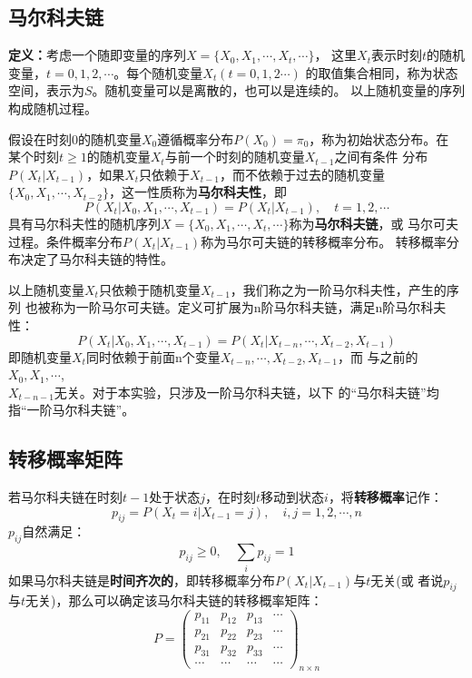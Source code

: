 \documentclass[12pt, a4paper, oneside]{ctexart}
\begin{document}
	\subsection{马尔科夫链}
	\textbf{定义：}\quad 考虑一个随即变量的序列$X=\{X_0,X_1,\cdots,X_t,\cdots \}$，
	这里$X_t$表示时刻$t$的随机变量，$t=0,1,2,\cdots$。每个随机变量$X_t(t=0,1,2\cdots)$
	的取值集合相同，称为状态空间，表示为$S$。随机变量可以是离散的，也可以是连续的。
	以上随机变量的序列构成随机过程。\par 
	假设在时刻0的随机变量$X_0$遵循概率分布$P(X_0)=\pi_0$，称为初始状态分布。在
	某个时刻$t\geq 1$的随机变量$X_t$与前一个时刻的随机变量$X_{t-1}$之间有条件
	分布$P(X_t|X_{t-1})$，如果$X_t$只依赖于$X_{t-1}$，而不依赖于过去的随机变量
	$\{X_0,X_1,\cdots,X_{t-2}\}$，这一性质称为\textbf{马尔科夫性}，即
	$$P(X_t|X_0,X_1,\cdots,X_{t-1})=P(X_t|X_{t-1}),\quad t=1,2,\cdots $$
	具有马尔科夫性的随机序列$X=\{X_0,X_1,\cdots,X_t,\cdots \}$称为\textbf{马尔科夫链}，或
	马尔可夫过程。条件概率分布$P(X_t|X_{t-1})$称为马尔可夫链的转移概率分布。
	转移概率分布决定了马尔科夫链的特性。\par 
	\vspace*{1em}
	以上随机变量$X_t$只依赖于随机变量$X_{t-1}$，我们称之为一阶马尔科夫性，产生的序列
	也被称为一阶马尔可夫链。定义可扩展为n阶马尔科夫链，满足n阶马尔科夫性：
	$$P(X_t|X_0,X_1,\cdots ,X_{t-1})=P(X_t|X_{t-n},\cdots ,X_{t-2},X_{t-1})$$
	即随机变量$X_t$同时依赖于前面n个变量$X_{t-n},\cdots,X_{t-2},X_{t-1}$，而
	与之前的$X_0,X_1,\cdots$,\\$X_{t-n-1}$无关。对于本实验，只涉及一阶马尔科夫链，以下
	的“马尔科夫链”均指“一阶马尔科夫链”。
	
	\subsection{转移概率矩阵}
	若马尔科夫链在时刻$t-1$处于状态$j$，在时刻$t$移动到状态$i$，将\textbf{转移概率}记作：
	$$p_{ij}=P(X_t=i|X_{t-1}=j),\quad i,j=1,2,\cdots ,n$$
	$p_{ij}$自然满足：$$p_{ij}\geq 0,\quad \sum_{i} p_{ij}=1 $$
	如果马尔科夫链是\textbf{时间齐次的}，即转移概率分布$P(X_t|X_{t-1})$与$t$无关(或
	者说$p_{ij}$与$t$无关)，那么可以确定该马尔科夫链的转移概率矩阵：
	$$ P = \begin{pmatrix}
		p_{11} & p_{12} & p_{13} & \cdots \\
		p_{21} & p_{22} & p_{23} & \cdots \\
		p_{31 }& p_{32} & p_{33} & \cdots \\
		\cdots&\cdots&\cdots&\cdots
	\end{pmatrix}_{n\times n} $$\par
	
\end{document}
